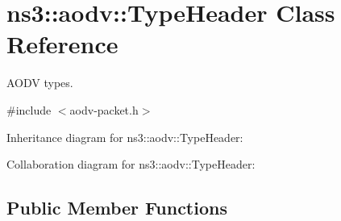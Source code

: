 \hypertarget{classns3_1_1aodv_1_1TypeHeader}{}\section{ns3\+:\+:aodv\+:\+:Type\+Header Class Reference}
\label{classns3_1_1aodv_1_1TypeHeader}


A\+O\+DV types.  




{\ttfamily \#include $<$aodv-\/packet.\+h$>$}



Inheritance diagram for ns3\+:\+:aodv\+:\+:Type\+Header\+:


Collaboration diagram for ns3\+:\+:aodv\+:\+:Type\+Header\+:
\subsection*{Public Member Functions}
